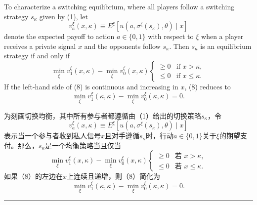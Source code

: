 \documentclass[12pt,a4paper]{article}
\newenvironment{original}
  {\par\medskip\noindent\color{black}\ignorespaces}
  {\par\medskip}
\newenvironment{translation}
  {\par\noindent\color{darkblue}\ignorespaces}
  {\par\medskip\noindent\hrule\par\medskip}
\theoremstyle{definition}
\theoremstyle{remark}
\begin{document}
\begin{original}
To characterize a switching equilibrium, where all players follow a switching strategy $s_\kappa$ given by (1), let
\[
v_a^\xi(x, \kappa) \equiv E^\xi[u(a, \sigma^\xi(s_\kappa), \theta) \mid x]
\]
denote the expected payoff to action $a \in \{0, 1\}$ with respect to $\xi$ when a player receives a private signal $x$ and the opponents follow $s_\kappa$. Then $s_\kappa$ is an equilibrium strategy if and only if
\[
\min_{\xi} v_1^\xi(x, \kappa) - \min_{\xi} v_0^\xi(x, \kappa)
\begin{cases}
\ge 0 & \text{if } x > \kappa,\\
\le 0 & \text{if } x \le \kappa.
\end{cases}
\tag{8}
\]
If the left-hand side of (8) is continuous and increasing in $x$, (8) reduces to
\[
\min_{\xi} v_1^\xi(\kappa, \kappa) - \min_{\xi} v_0^\xi(\kappa, \kappa) = 0.
\tag{9}
\]
\end{original}
\begin{translation}
为刻画切换均衡，其中所有参与者都遵循由（1）给出的切换策略$s_\kappa$，令
\[
v_a^\xi(x, \kappa) \equiv E^\xi[u(a, \sigma^\xi(s_\kappa), \theta) \mid x]
\]
表示当一个参与者收到私人信号$x$且对手遵循$s_\kappa$时，行动$a \in \{0, 1\}$关于$\xi$的期望支付。那么，$s_\kappa$是一个均衡策略当且仅当
\[
\min_{\xi} v_1^\xi(x, \kappa) - \min_{\xi} v_0^\xi(x, \kappa)
\begin{cases}
\ge 0 & \text{若 } x > \kappa,\\
\le 0 & \text{若 } x \le \kappa.
\end{cases}
\tag{8}
\]
如果（8）的左边在$x$上连续且递增，则（8）简化为
\[
\min_{\xi} v_1^\xi(\kappa, \kappa) - \min_{\xi} v_0^\xi(\kappa, \kappa) = 0.
\tag{9}
\]
\end{translation}
\end{document}
